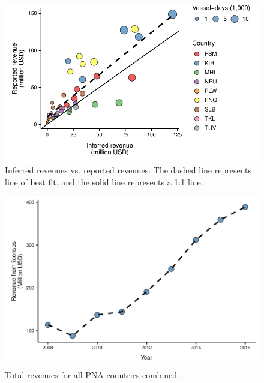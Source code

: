 \documentclass[12pt]{article}
\begin{document}
\begin{figure}
\centering
	\includegraphics{img/revenue_FFA_GFW_linear.pdf}
	\caption{\label{fig:revenue_FFA_GFW_linear}Inferred revenues vs. reported revenues. The dashed line represents line of best fit, and the solid line represents a 1:1 line.}
\end{figure}

\begin{figure}
\centering
	\includegraphics{img/total_PNA_revenues.pdf}
	\caption{\label{fig:total_PNA_revenues}Total revenues for all PNA countries combined.}
\end{figure}
\end{document}
